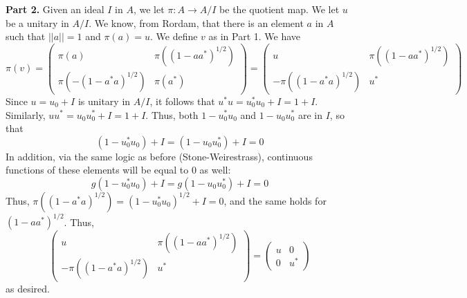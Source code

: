 \documentclass[aps,pra,showpacs,notitlepage,onecolumn,superscriptaddress,nofootinbib]{revtex4-1}
\theoremstyle{definition}
\begin{document}
\noindent \textbf{Part 2.} Given an ideal $I$ in $A$, we let $\pi : A \rightarrow A/I$ be the quotient map. We let $u$ be a unitary in $A/I$. We know, from Rordam,
that there is an element $a$ in $A$ such that $||a|| = 1$ and $\pi(a) = u$. We define $v$ as in Part 1. We have
\begin{equation}
  \pi(v) =  \begin{pmatrix} \pi(a) &  \pi((1 - a a^{*})^{1/2}) \\ \pi(-(1 - a^{*} a)^{1/2}) & \pi(a^{*}) \end{pmatrix} =  \begin{pmatrix} u &  \pi((1 - a a^{*})^{1/2}) \\ -\pi((1 - a^{*} a)^{1/2}) & u^{*} \end{pmatrix}
\end{equation}
Since $u = u_0 + I$ is unitary in $A/I$, it follows that $u^{*} u = u_0^{*} u_0 + I = 1 + I$. Similarly, $u u^{*} = u_0 u_0^{*} + I = 1 + I$. Thus,
both $1 - u_0^{*} u_0$ and $1 - u_0 u_0^{*}$ are in $I$, so that
\begin{equation}
  (1 - u_0^{*} u_0) + I = (1 - u_0 u_0^{*}) + I = 0
\end{equation}
In addition, via the same logic as before (Stone-Weirestrass), continuous functions of these elements will be equal to $0$ as well:
\begin{equation}
  g(1 - u_0^{*} u_0) + I = g(1 - u_0 u_0^{*}) + I = 0
\end{equation}
Thus, $\pi( (1 - a^{*} a)^{1/2}) = (1 - u_0^{*} u_0)^{1/2} + I = 0$, and the same holds for $(1 - a a^{*})^{1/2}$. Thus,
\begin{equation}
  \begin{pmatrix} u &  \pi((1 - a a^{*})^{1/2}) \\ -\pi((1 - a^{*} a)^{1/2}) & u^{*} \end{pmatrix} = \begin{pmatrix} u &  0 \\ 0 & u^{*} \end{pmatrix}
\end{equation}
as desired.
\newline
\end{document}
